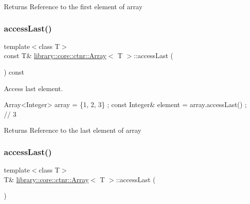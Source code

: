 \begin{DoxyReturn}{Returns}
Reference to the first element of array 
\end{DoxyReturn}
\mbox{\label{classlibrary_1_1core_1_1ctnr_1_1_array_ad95dcce8ddaf163903a2327f766dbc8a}} 
\subsubsection{\texorpdfstring{access\+Last()}{accessLast()}\hspace{0.1cm}{\footnotesize\ttfamily [1/2]}}
{\footnotesize\ttfamily template$<$class T$>$ \\
const T\& \hyperlink{classlibrary_1_1core_1_1ctnr_1_1_array}{library\+::core\+::ctnr\+::\+Array}$<$ T $>$\+::access\+Last (\begin{DoxyParamCaption}{ }\end{DoxyParamCaption}) const}



Access last element. 


\begin{DoxyCode}
Array<Integer> array = \{1, 2, 3\} ;
\textcolor{keyword}{const} Integer& element = array.accessLast() ; \textcolor{comment}{// 3}
\end{DoxyCode}


\begin{DoxyReturn}{Returns}
Reference to the last element of array 
\end{DoxyReturn}
\mbox{\label{classlibrary_1_1core_1_1ctnr_1_1_array_ad6ea47ab09dfeebd6de0878d3ad2de25}} 
\subsubsection{\texorpdfstring{access\+Last()}{accessLast()}\hspace{0.1cm}{\footnotesize\ttfamily [2/2]}}
{\footnotesize\ttfamily template$<$class T$>$ \\
T\& \hyperlink{classlibrary_1_1core_1_1ctnr_1_1_array}{library\+::core\+::ctnr\+::\+Array}$<$ T $>$\+::access\+Last (\begin{DoxyParamCaption}{ }\end{DoxyParamCaption})}



